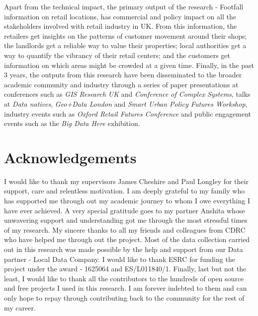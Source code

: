 Apart from the technical impact, the primary output of the research - Footfall information on retail locations, has commercial and policy impact on all the stakeholders involved with retail industry in UK. 
From this information, the retailers get insights on the patterns of customer movement around their shops; the landlords get a reliable way to value their properties; local authorities get a way to quantify the vibrancy of their retail centers; and the customers get information on which areas might be crowded at a given time.
Finally, in the past 3 years, the outputs from this research have been disseminated to the broader academic community and industry through a series of paper presentations at conferences such as \textit{GIS Research UK} and \textit{Conference of Complex Systems}, talks at \textit{Data natives}, \textit{Geo+Data London} and \textit{Smart Urban Policy Futures Workshop}, industry events such as \textit{Oxford Retail Futures Conference} and public engagement events such as the \textit{Big Data Here} exhibition.

\section*{Acknowledgements} 

I would like to thank my supervisors James Cheshire and Paul Longley for their support, care and relentless motivation.
I am deeply grateful to my family who has supported me through out my academic journey to whom I owe everything I have ever achieved.
A very special gratitude goes to my partner Anshita whose unwavering support and understanding got me through the most stressful times of my research.
My sincere thanks to all my friends and colleagues from CDRC who have helped me through out the project.
Most of the data collection carried out in this research was made possible by the help and support from our Data partner - Local Data Company.
I would like to thank ESRC for funding the project under the award - 1625064 and ES/L011840/1.
Finally, last but not the least, I would like to thank all the contributors to the hundreds of open source and free projects I used in this research. I am forever indebted to them and can only hope to repay through contributing back to the community for the rest of my career.
